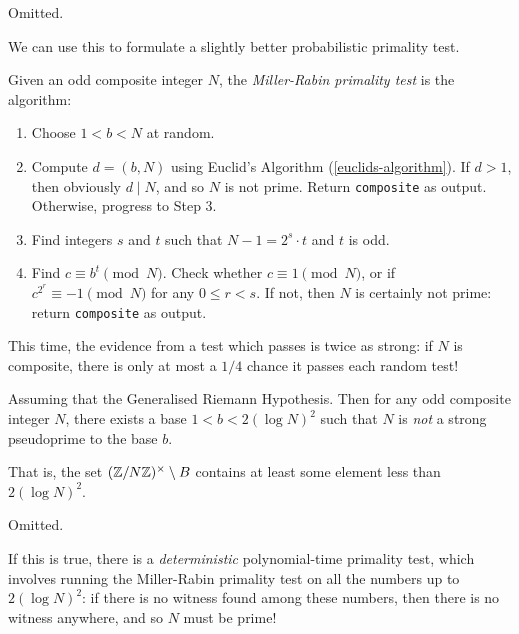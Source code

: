 \documentclass{article}
\begin{document}
\begin{prf}
    Omitted.
\end{prf}

We can use this to formulate a slightly better probabilistic primality test.

\begin{definition}
    Given an odd composite integer $N$, the \textit{Miller-Rabin primality test} is the algorithm:
    \begin{enumerate}
	    \item Choose $1 < b < N$ at random.
	    \item Compute $d = (b, N)$ using Euclid's Algorithm (\ref{euclids-algorithm}). If $d > 1$, then obviously $d \mid N$, and so $N$ is not prime. Return \texttt{composite} as output. Otherwise, progress to Step 3.
	    \item Find integers $s$ and $t$ such that $N-1 = 2^s \cdot t$ and $t$ is odd.
	    \item Find $c \equiv b^t \pmod N$. Check whether $c \equiv 1 \pmod N$, or if $c^{2^r} \equiv -1 \pmod N$ for any $0 \leq r < s$. If not, then $N$ is certainly not prime: return \texttt{composite} as output.
	\end{enumerate}
	This time, the evidence from a test which passes is twice as strong: if $N$ is composite, there is only at most a $1/4$ chance it passes each random test!
\end{definition}

\begin{theorem}
    Assuming that the Generalised Riemann Hypothesis. Then for any odd composite integer $N$, there exists a base $1 < b < 2 (\log N)^2$ such that $N$ is \textit{not} a strong pseudoprime to the base $b$.
    
    That is, the set $(\mathbb{Z}/N\mathbb{Z})^\times \setminus B$ contains at least some element less than $2 (\log N)^2$.
\end{theorem}

\begin{prf}
    Omitted.
\end{prf}

\begin{corollary}
    If this is true, there is a \textit{deterministic} polynomial-time primality test, which involves running the Miller-Rabin primality test on all the numbers up to $2 (\log N)^2$: if there is no witness found among these numbers, then there is no witness anywhere, and so $N$ must be prime!
\end{corollary}
\end{document}
